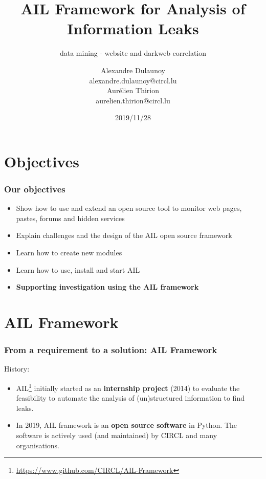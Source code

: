 \documentclass{beamer}
\author{\Large{Alexandre Dulaunoy}\\ \scriptsize{alexandre.dulaunoy@circl.lu}\\ \large{Aurélien Thirion}\\ \scriptsize{aurelien.thirion@circl.lu}\\}
\title{AIL Framework for Analysis of Information Leaks}
\subtitle{data mining - website and darkweb correlation}
\institute{info@circl.lu}
\date{2019/11/28}
\begin{document}
\begin{frame}[t,plain]
\titlepage
\end{frame}

\section{Objectives}
\begin{frame}
\frametitle{Our objectives}
    \begin{itemize}
        \item Show how to use and extend an open source tool to monitor web pages, pastes, forums and hidden services
        \item Explain challenges and the design of the AIL open source framework
        \item Learn how to create new modules
        \item Learn how to use, install and start AIL
        \item {\bf Supporting investigation using the AIL framework}
    \end{itemize}
\end{frame}

\section{AIL Framework}
\begin{frame}
    \frametitle{From a requirement to a solution: AIL Framework}
    \large{History:}
    \begin{itemize}
            \item AIL\footnote{\url{https://www.github.com/CIRCL/AIL-Framework}} initially started as an \textbf{internship project} (2014) to evaluate the feasibility to automate the analysis of (un)structured information to find leaks.
        \item In 2019, AIL framework is an \textbf{open source software} in Python. The software is actively used (and maintained) by CIRCL and many organisations.
    \end{itemize}
\end{frame}
\end{document}
